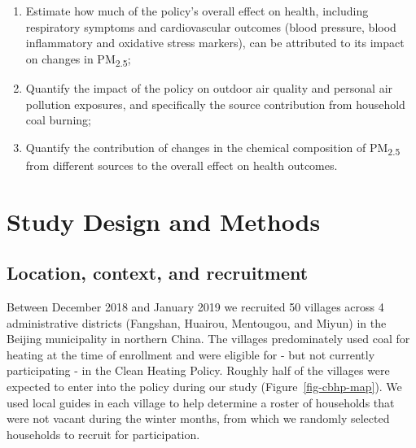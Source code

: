 \documentclass[
  letterpaper,
  DIV=11,
  numbers=noendperiod]{scrartcl}
\begin{document}
\begin{enumerate}
\def\labelenumi{\arabic{enumi}.}
\item
  Estimate how much of the policy's overall effect on health, including
  respiratory symptoms and cardiovascular outcomes (blood pressure,
  blood inflammatory and oxidative stress markers), can be attributed to
  its impact on changes in PM\textsubscript{2.5};
\item
  Quantify the impact of the policy on outdoor air quality and personal
  air pollution exposures, and specifically the source contribution from
  household coal burning;
\item
  Quantify the contribution of changes in the chemical composition of
  PM\textsubscript{2.5} from different sources to the overall effect on
  health outcomes.
\end{enumerate}

\hypertarget{study-design-and-methods}{%
\section{Study Design and Methods}\label{study-design-and-methods}}

\hypertarget{location-context-and-recruitment}{%
\subsection{Location, context, and
recruitment}\label{location-context-and-recruitment}}

Between December 2018 and January 2019 we recruited 50 villages across 4
administrative districts (Fangshan, Huairou, Mentougou, and Miyun) in
the Beijing municipality in northern China. The villages predominately
used coal for heating at the time of enrollment and were eligible for -
but not currently participating - in the Clean Heating Policy. Roughly
half of the villages were expected to enter into the policy during our
study (Figure~\ref{fig-cbhp-map}). We used local guides in each village
to help determine a roster of households that were not vacant during the
winter months, from which we randomly selected households to recruit for
participation.
\end{document}
